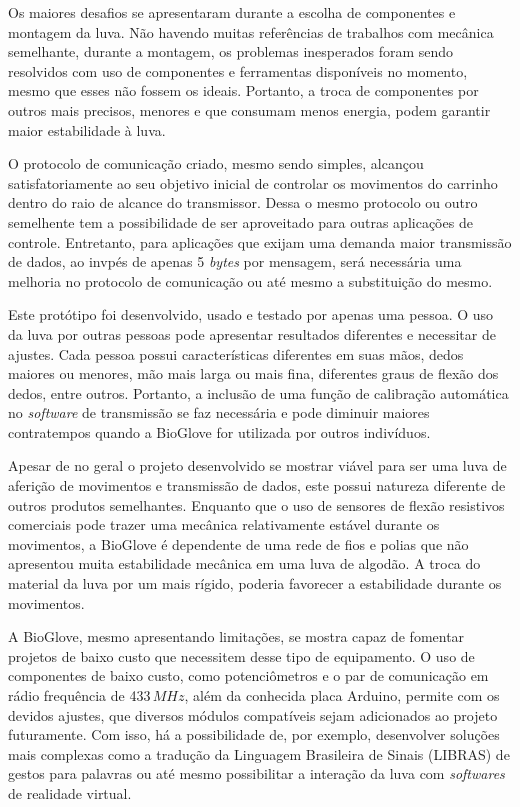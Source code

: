 \documentclass[
	12pt,				%
	openright,			%
	oneside,			%
	a4paper,			%
	english,			%
	brazil				%
	]{abntex2}
\begin{document}
		Os maiores desafios se apresentaram durante a escolha de componentes e montagem da luva. Não havendo muitas referências de trabalhos com mecânica semelhante, durante a montagem, os problemas inesperados foram sendo resolvidos com uso de componentes e ferramentas disponíveis no momento, mesmo que esses não fossem os ideais. Portanto, a troca de componentes por outros mais precisos, menores e que consumam menos energia, podem garantir maior estabilidade à luva.

		O protocolo de comunicação criado, mesmo sendo simples, alcançou satisfatoriamente ao seu objetivo inicial de controlar os movimentos do carrinho dentro do raio de alcance do transmissor. Dessa o mesmo protocolo ou outro semelhente tem a possibilidade de ser aproveitado para outras aplicações de controle. Entretanto, para aplicações que exijam uma demanda maior transmissão de dados, ao invpés de apenas 5 \textit{bytes} por mensagem, será necessária uma melhoria no protocolo de comunicação ou até mesmo a substituição do mesmo.

		Este protótipo foi desenvolvido, usado e testado por apenas uma pessoa. O uso da luva por outras pessoas pode apresentar resultados diferentes e necessitar de ajustes. Cada pessoa possui características diferentes em suas mãos, dedos maiores ou menores, mão mais larga ou mais fina, diferentes graus de flexão dos dedos, entre outros. Portanto, a inclusão de uma função de calibração automática no \textit{software} de transmissão se faz necessária e pode diminuir maiores contratempos quando a BioGlove for utilizada por outros indivíduos.


		Apesar de no geral o projeto desenvolvido se mostrar viável para ser uma luva de aferição de movimentos e transmissão de dados, este possui natureza diferente de outros produtos semelhantes. Enquanto que o uso de sensores de flexão resistivos comerciais pode trazer uma mecânica relativamente estável durante os movimentos, a BioGlove é dependente de uma rede de fios e polias que não apresentou muita estabilidade mecânica em uma luva de algodão. A troca do material da luva por um  mais rígido, poderia favorecer a estabilidade durante os movimentos.

		A BioGlove, mesmo apresentando limitações, se mostra capaz de fomentar projetos de baixo custo que necessitem desse tipo de equipamento. O uso de componentes de baixo custo, como potenciômetros e o par de comunicação em rádio frequência de 433$\,MHz$, além da conhecida placa Arduino, permite com os devidos ajustes, que diversos módulos compatíveis sejam adicionados ao projeto futuramente. Com isso, há a possibilidade de, por exemplo, desenvolver soluções mais complexas como a tradução da Linguagem Brasileira de Sinais (LIBRAS) de gestos para palavras ou até mesmo possibilitar a interação da luva com \textit{softwares} de realidade virtual.
\end{document}
